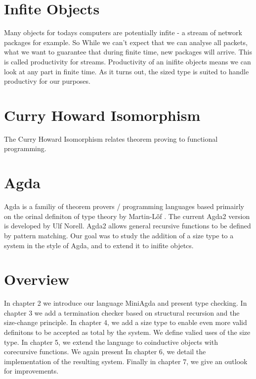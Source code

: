 \section{Infite Objects}
Many objects for todays computers are potentially infite - a stream of network packages for example.
So 
While we can't expect that we can analyse all packets, what we want to guarantee that during finite time,
new packages will arrive. This is called productivity for streams.
Productivity of an inifite objects means we can look at any part in finite time.
As it turns out, the sized type is suited to handle productivy for our purposes.
\section {Curry Howard Isomorphism}
The Curry Howard Isomorphism relates theorem proving to functional programming.
\section{Agda}
Agda is a familiy of theorem provers / programming languages based primairly on the 
orinal definiton of type theory by Martin-L\"öf \cite{mart84}.
The current Agda2 version is developed by Ulf Norell.
Agda2 allows general recursive functions to be defined by pattern matching.
Our goal was to study the addition of a size type to a system in the style of Agda, and to
extend it to inifite objetcs.

\section{Overview}
In chapter 2 we introduce our language MiniAgda and present type checking.
In chapter 3 we add a termination checker based on structural recursion and the size-change principle.
In chapter 4, we add a size type to enable even more valid definitons to be accepted as total by the system.
We define valied uses of the size type.
In chapter 5, we extend the language to coinductive objects with corecursive functions.
We again present 
In chapter 6, we detail the implementation of the resulting system.
Finally in chapter 7, we give an outlook for improvements.





